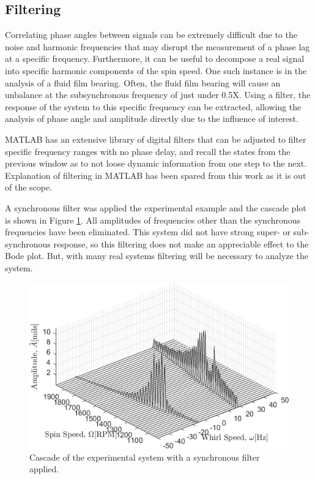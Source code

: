 \subsection{Filtering}
Correlating phase angles between signals can be extremely difficult due to the noise and harmonic frequencies that may disrupt the measurement of a phase lag at a specific frequency. Furthermore, it can be useful to decompose a real signal into specific harmonic components of the spin speed. One such instance is in the analysis of a fluid film bearing. Often, the fluid film bearing will cause an unbalance at the subsynchronous frequency of just under 0.5X. Using a filter, the response of the system to this specific frequency can be extracted, allowing the analysis of phase angle and amplitude directly due to the influence of interest.\par 
MATLAB has an extensive library of digital filters that can be adjusted to filter specific frequency ranges with no phase delay, and recall the states from the previous window as to not loose dynamic information from one step to the next. Explanation of filtering in MATLAB has been spared from this work as it is out of the scope.\par 
A synchronous filter was applied the experimental example and the cascade plot is shown in Figure \ref{fig:ExpExampleCascade2}. All amplitudes of frequencies other than the synchronous frequencies have been eliminated. This system did not have strong super- or sub-synchronous response, so this filtering does not make an appreciable effect to the Bode plot. But, with many real systems filtering will be necessary to analyze the system.
\begin{figure}
	\centering
	\includegraphics[width=\linewidth]{./figures/ExpExampleCascadeFilt.png}
	\caption{Cascade of the experimental system with a synchronous filter applied.}
	\label{fig:ExpExampleCascade2}
\end{figure}
